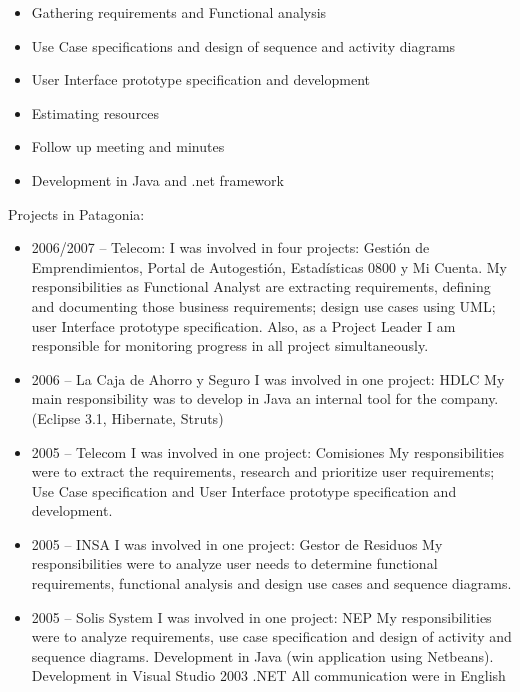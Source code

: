 \documentclass[11pt,a4paper,sans]{moderncv}
\begin{document}

\begin{itemize}
  \item Gathering requirements and Functional analysis
  \item Use Case specifications and design of sequence and activity diagrams
  \item User Interface prototype specification and development
  \item Estimating resources
  \item Follow up meeting and minutes
  \item Development in Java and .net framework
  \newline
\end{itemize}

Projects in Patagonia:
\begin{itemize}
  \item 2006/2007 – Telecom: \newline{}
I was involved in four projects: Gestión de Emprendimientos, Portal de Autogestión, Estadísticas 0800 y Mi Cuenta.
My responsibilities as Functional Analyst are extracting requirements, defining and documenting those business requirements; design use cases using UML;  user Interface prototype specification. Also, as a Project Leader I am responsible for monitoring progress in all project simultaneously.

  \item 2006 –  La Caja de Ahorro y Seguro \newline{}
I was involved in one project: HDLC
My main responsibility was to develop in Java an internal tool for the company. (Eclipse 3.1, Hibernate, Struts)

  \item 2005 – Telecom \newline{}
I was involved in one project: Comisiones
My responsibilities were to extract the requirements, research and prioritize user requirements; Use Case specification and User Interface prototype specification and development.

  \item 2005 – INSA \newline{}
I was involved in one project: Gestor de Residuos
My responsibilities were to analyze user needs to determine functional requirements, functional analysis and design use cases and sequence diagrams.

  \item 2005 – Solis System \newline{}
I was involved in one project: NEP
My responsibilities were to analyze requirements, use case specification and design of activity and sequence diagrams.
Development in Java (win application using Netbeans).
Development in Visual Studio 2003 .NET
All communication were in English
\newline{}
\end{itemize}
\end{document}

